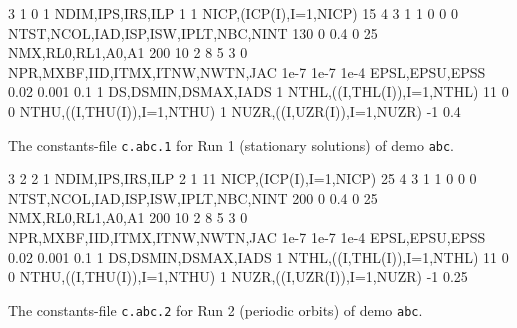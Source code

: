 \documentclass[12pt]{report}
\begin{document}
\begin{table}[htbp]
{\small
\begin{center}
\begin{boxedverbatim}
3 1 0 1                         NDIM,IPS,IRS,ILP
1   1                           NICP,(ICP(I),I=1,NICP)
15 4 3 1 1 0 0 0                NTST,NCOL,IAD,ISP,ISW,IPLT,NBC,NINT
130 0 0.4 0 25                  NMX,RL0,RL1,A0,A1
200 10 2 8 5 3 0                NPR,MXBF,IID,ITMX,ITNW,NWTN,JAC
1e-7 1e-7 1e-4                  EPSL,EPSU,EPSS
0.02 0.001 0.1 1                DS,DSMIN,DSMAX,IADS
1                               NTHL,((I,THL(I)),I=1,NTHL)
11 0
0                               NTHU,((I,THU(I)),I=1,NTHU)
1                               NUZR,((I,UZR(I)),I=1,NUZR)
-1 0.4
\end{boxedverbatim}
\end{center}
}
\caption{The constants-file {\tt c.abc.1} for Run 1 (stationary solutions)
of demo {\tt abc}.}
\label{tbl:demo_abcC1}
\end{table}


\begin{table}[htbp]
{\small
\begin{center}
\begin{boxedverbatim}
3 2 2 1                         NDIM,IPS,IRS,ILP
2   1 11                        NICP,(ICP(I),I=1,NICP)
25 4 3 1 1 0 0 0                NTST,NCOL,IAD,ISP,ISW,IPLT,NBC,NINT
200 0 0.4 0 25                  NMX,RL0,RL1,A0,A1
200 10 2 8 5 3 0                NPR,MXBF,IID,ITMX,ITNW,NWTN,JAC
1e-7 1e-7 1e-4                  EPSL,EPSU,EPSS
0.02 0.001 0.1 1                DS,DSMIN,DSMAX,IADS
1                               NTHL,((I,THL(I)),I=1,NTHL)
11 0
0                               NTHU,((I,THU(I)),I=1,NTHU)
1                               NUZR,((I,UZR(I)),I=1,NUZR)
-1 0.25
\end{boxedverbatim}
\end{center}
}
\caption{The constants-file {\tt c.abc.2} for Run 2 (periodic orbits) 
of demo {\tt abc}.}
\label{tbl:demo_abcC2}
\end{table}
\end{document}

